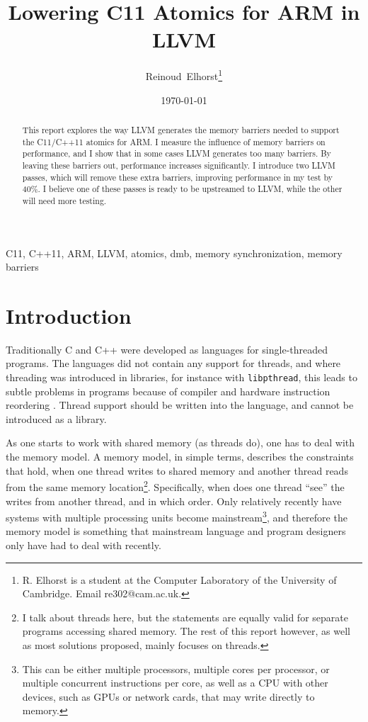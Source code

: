 \documentclass[journal]{IEEEtran}
\begin{document}
\title{Lowering C11 Atomics for ARM in LLVM}
\author{Reinoud~Elhorst\thanks{R. Elhorst is a student at the Computer Laboratory of the University of Cambridge. Email re302@cam.ac.uk.}}
\date{\today}
\maketitle

\begin{abstract}
    This report explores the way LLVM generates the memory barriers needed to support the C11/C++11 atomics for ARM.
    I measure the influence of memory barriers on performance, and I show that in some cases LLVM generates too many barriers.
    By leaving these barriers out, performance increases significantly.
    I introduce two LLVM passes, which will remove these extra barriers, improving performance in my test by 40\%.
    I believe one of these passes is ready to be upstreamed to LLVM, while the other will need more testing.
\end{abstract}

\begin{IEEEkeywords}
    C11, C++11, ARM, LLVM, atomics, dmb, memory synchronization, memory barriers
\end{IEEEkeywords}

\section{Introduction}
Traditionally C and C++ were developed as languages for single-threaded programs.
The languages did not contain any support for threads, and where threading was introduced in libraries, for instance with \texttt{libpthread}, this leads to subtle problems in programs because of compiler and hardware instruction reordering \cite{boehm2005threads}.
Thread support should be written into the language, and cannot be introduced as a library.

As one starts to work with shared memory (as threads do), one has to deal with the memory model.
A memory model, in simple terms, describes the constraints that hold, when one thread writes to shared memory and another thread reads from the same memory location\footnote{I talk about threads here, but the statements are equally valid for separate programs accessing shared memory. The rest of this report however, as well as most solutions proposed, mainly focuses on threads.}.
Specifically, when does one thread ``see'' the writes from another thread, and in which order.
Only relatively recently have systems with multiple processing units become mainstream\footnote{This can be either multiple processors, multiple cores per processor, or multiple concurrent instructions per core, as well as a CPU with other devices, such as GPUs or network cards, that may write directly to memory.}, and therefore the memory model is something that mainstream language and program designers only have had to deal with recently.
\end{document}
